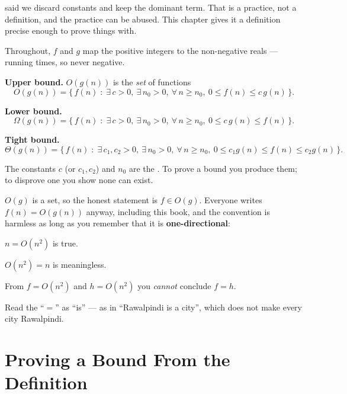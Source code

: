  said we discard constants and keep the dominant term. That is a
practice, not a definition, and the practice can be abused. This chapter gives
it a definition precise enough to prove things with.

Throughout, $f$ and $g$ map the positive integers to the non-negative reals ---
running times, so never negative.

\begin{definitionbox}
\textbf{Upper bound.} $O(g(n))$ is the \emph{set} of functions
\[ O(g(n)) = \bigl\{\, f(n) \;:\;
   \exists\, c > 0,\ \exists\, n_{0} > 0,\
   \forall\, n \ge n_{0},\ 0 \le f(n) \le c\,g(n) \,\bigr\}. \]

\smallskip
\textbf{Lower bound.}
\[ \Omega(g(n)) = \bigl\{\, f(n) \;:\;
   \exists\, c > 0,\ \exists\, n_{0} > 0,\
   \forall\, n \ge n_{0},\ 0 \le c\,g(n) \le f(n) \,\bigr\}. \]

\smallskip
\textbf{Tight bound.}
\[ \Theta(g(n)) = \bigl\{\, f(n) \;:\;
   \exists\, c_{1}, c_{2} > 0,\ \exists\, n_{0} > 0,\
   \forall\, n \ge n_{0},\
   0 \le c_{1} g(n) \le f(n) \le c_{2} g(n) \,\bigr\}. \]

\smallskip
The constants $c$ (or $c_{1}, c_{2}$) and $n_{0}$ are the . To
prove a bound you produce them; to disprove one you show none can exist.
\end{definitionbox}

\begin{alertbox}[``$f(n) = O(g(n))$'' is an abuse of the equals sign, and you should know it]
$O(g)$ is a set, so the honest statement is $f \in O(g)$. Everyone writes
$f(n) = O(g(n))$ anyway, including this book, and the convention is harmless as
long as you remember that it is \textbf{one-directional}:

\begin{tight}
  \item $n = O(n^{2})$ is true.
  \item $O(n^{2}) = n$ is meaningless.
  \item From $f = O(n^{2})$ and $h = O(n^{2})$ you \emph{cannot} conclude
        $f = h$.
\end{tight}

\smallskip
Read the ``$=$'' as ``is'' --- as in ``Rawalpindi is a city'', which does not
make every city Rawalpindi.
\end{alertbox}

\section{Proving a Bound From the Definition}

